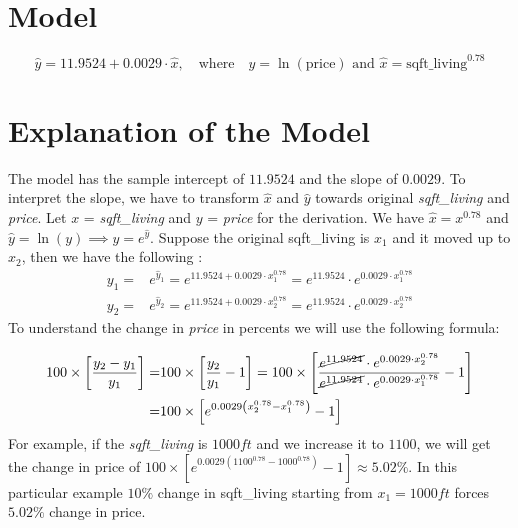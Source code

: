 \documentclass[12pt]{article}
\begin{document}
	\nopagebreak
\section*{Model}
	\[\hat{y}=11.9524+0.0029\cdot \hat{x},\quad \text{where}\quad  \hat{y}=\ln (\text{price})\text{ and } \hat{x} = \text{sqft\_living}^{0.78}  \]
\section*{Explanation of the Model}
The model has the sample intercept of \(11.9524\) and the slope of \(0.0029\).  To interpret the slope, we have to transform \(\hat{x}\) and \(\hat{y}\) towards original {\it sqft\_living} and {\it price}. Let \(x\) = {\it sqft\_living}  and \(y\) = {\it price} for the derivation. We have  \(\hat{x} = x^{0.78}\) and \(\hat{y} = \ln (y)\implies y  = e^{\hat{y}}\). Suppose the original sqft\_living is \(x_1\) and it moved up to \(x_2\), then we have the following :
\begin{align*}
	y_1 =& e^{\hat{y}_1 }= e^{11.9524+0.0029\cdot x_1^{0.78}}  = e^{11.9524}\cdot e^{0.0029\cdot x_1^{0.78}}\\
	y_2 =& e^{\hat{y}_2 }= e^{11.9524+0.0029\cdot x_2^{0.78}}  = e^{11.9524}\cdot e^{0.0029\cdot x_2^{0.78}}
\end{align*}
To understand the change in {\it price} in percents we will use the following formula:

\begin{align*}
100 \times \left[\frac{y_2-y_1}{y_1} \right] =& 100 \times \left[\frac{y_2}{y_1} - 1\right] = 100\times \left[\frac{ \cancel{e^{11.9524}}\cdot e^{0.0029\cdot x_2^{0.78}}}{\cancel{e^{11.9524}}\cdot e^{0.0029\cdot x_1^{0.78}}} -1 \right] \\
=& 100 \times \left[ e^{0.0029\left( x_2^{0.78} - x_1^{0.78} \right)} -1 \right]
\end{align*}
For example, if the {\it sqft\_living} is \(1000ft\) and we increase it to \(1100\), we will get the change in price of \(100\times \left[e^{0.0029(1100^{0.78}-1000^{0.78})}-1\right] \approx 5.02\% \). In this particular example \(10\%\) change in sqft\_living starting from \(x_1 = 1000ft\) forces \(5.02\%\) change in price.
\pagebreak
\end{document}
